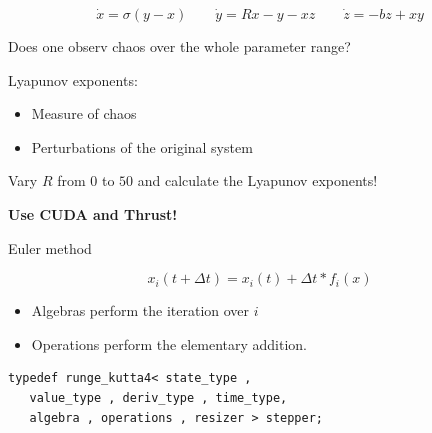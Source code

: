 \begin{frame}[fragile]
 


 $$
  \dot{x} = \sigma ( y - x ) \quad \quad \dot{y} = R x - y - x z \quad \quad \dot{z} = -b z + x y
 $$


Does one observ chaos over the whole parameter range?

\vspace{2ex}

Lyapunov exponents:
\begin{itemize}
 \item Measure of chaos
 \item Perturbations of the original system
\end{itemize}

\vspace{2ex}
Vary $R$ from $0$ to $50$ and calculate the Lyapunov exponents!

\vspace{2ex}
\centerline{\bf Use CUDA and Thrust!}

\end{frame}


\begin{frame}[fragile]


 \vspace{2ex}

Euler method

$$ x_i(t+\Delta t) = x_i(t) + \Delta t * f_i(x)$$

\begin{itemize}
\item Algebras perform the iteration over $i$
\item Operations perform the elementary addition.
\end{itemize}

\vspace{2ex}

\begin{lstlisting}
typedef runge_kutta4< state_type ,
   value_type , deriv_type , time_type,
   algebra , operations , resizer > stepper; 
\end{lstlisting}

\end{frame}

